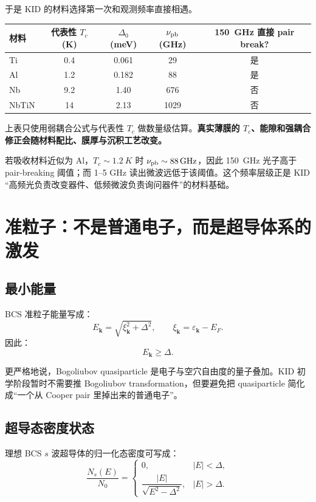 \documentclass[11pt,a4paper,openany]{ctexrep}
\begin{document}
于是 KID 的材料选择第一次和观测频率直接相遇。

\begin{center}
\renewcommand{\arraystretch}{1.2}
\begin{tabular}{lcccc}
\toprule
材料 & 代表性 $T_c$ (K) & $\Delta_0$ (meV) & $\nu_{\rm pb}$ (GHz) & \SI{150}{GHz} 直接 pair break?\\
\midrule
Ti & 0.4 & 0.061 & 29 & 是 \\
Al & 1.2 & 0.182 & 88 & 是 \\
Nb & 9.2 & 1.40 & 676 & 否 \\
NbTiN & 14 & 2.13 & 1029 & 否 \\
\bottomrule
\end{tabular}
\end{center}

\noindent
上表只使用弱耦合公式与代表性 $T_c$ 做数量级估算。\textbf{真实薄膜的 $T_c$、能隙和强耦合修正会随材料配比、膜厚与沉积工艺改变。}

\begin{projectbox}
若吸收材料近似为 Al，$T_c\sim\SI{1.2}{K}$ 时 $\nu_{\rm pb}\sim\SI{88}{GHz}$，因此 \SI{150}{GHz} 光子高于 pair-breaking 阈值；而 1--5 GHz 读出微波远低于该阈值。这个频率层级正是 KID “高频光负责改变器件、低频微波负责询问器件”的材料基础。
\end{projectbox}

\section{准粒子：不是普通电子，而是超导体系的激发}

\subsection{最小能量}
BCS 准粒子能量写成：
\[
\boxed{
E_{\mathbf{k}}=\sqrt{\xi_{\mathbf{k}}^2+\Delta^2},
\qquad
\xi_{\mathbf{k}}=\varepsilon_{\mathbf{k}}-E_F.
}
\]
因此：
\[
E_{\mathbf{k}}\ge\Delta.
\]

更严格地说，Bogoliubov quasiparticle 是电子与空穴自由度的量子叠加。KID 初学阶段暂时不需要推 Bogoliubov transformation，但要避免把 quasiparticle 简化成“一个从 Cooper pair 里掉出来的普通电子”。

\subsection{超导态密度状态}
理想 BCS $s$ 波超导体的归一化态密度可写成：
\[
\frac{N_s(E)}{N_0}
=
\begin{cases}
0, & |E|<\Delta,\\[0.4em]
\dfrac{|E|}{\sqrt{E^2-\Delta^2}}, & |E|>\Delta.
\end{cases}
\]
\end{document}
